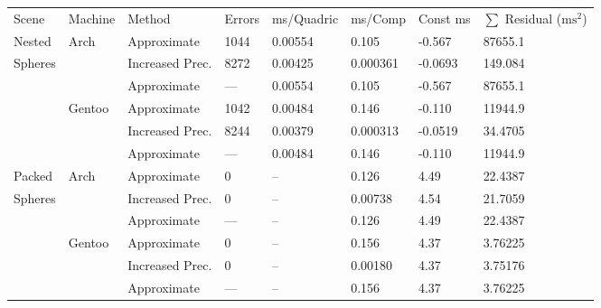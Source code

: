 \begin{tabular}{|l|l|ll|lll|l|}
\hline
Scene & Machine & Method & Errors & ms/Quadric & ms/Comp & Const ms & $\sum$ Residual ($\text{ms}^2$)\\
\hhline{|=|=|==|===|=|}
\hhline{|~|-|--|---|-|}
Nested & Arch & Approximate & 1044 & 0.00554 & \hphantom{-}0.105 & -0.567 & \hphantom{0}\hphantom{-}87655.1\\
Spheres &  & Increased Prec. & 8272 & 0.00425 & \hphantom{-}0.000361 & -0.0693 & \hphantom{000}\hphantom{-}149.084\\
 &  & Approximate & \hphantom{-}--- & 0.00554 & \hphantom{-}0.105 & -0.567 & \hphantom{0}\hphantom{-}87655.1\\
\hhline{|~|-|--|---|-|}
 & Gentoo & Approximate & 1042 & 0.00484 & \hphantom{-}0.146 & -0.110 & \hphantom{0}\hphantom{-}11944.9\\
 &  & Increased Prec. & 8244 & 0.00379 & \hphantom{-}0.000313 & -0.0519 & \hphantom{0000}\hphantom{-}34.4705\\
 &  & Approximate & \hphantom{-}--- & 0.00484 & \hphantom{-}0.146 & -0.110 & \hphantom{0}\hphantom{-}11944.9\\
\hhline{|-|-|--|---|-|}
Packed & Arch & Approximate & \hphantom{00}0 & -- & \hphantom{-}0.126 & \hphantom{-}4.49 & \hphantom{0000}\hphantom{-}22.4387\\
Spheres &  & Increased Prec. & \hphantom{00}0 & -- & \hphantom{-}0.00738 & \hphantom{-}4.54 & \hphantom{0000}\hphantom{-}21.7059\\
 &  & Approximate & \hphantom{-}--- & -- & \hphantom{-}0.126 & \hphantom{-}4.49 & \hphantom{0000}\hphantom{-}22.4387\\
\hhline{|~|-|--|---|-|}
 & Gentoo & Approximate & \hphantom{00}0 & -- & \hphantom{-}0.156 & \hphantom{-}4.37 & \hphantom{00000}\hphantom{-}3.76225\\
 &  & Increased Prec. & \hphantom{00}0 & -- & \hphantom{-}0.00180 & \hphantom{-}4.37 & \hphantom{00000}\hphantom{-}3.75176\\
 &  & Approximate & \hphantom{-}--- & -- & \hphantom{-}0.156 & \hphantom{-}4.37 & \hphantom{00000}\hphantom{-}3.76225\\
\hline
\end{tabular}
